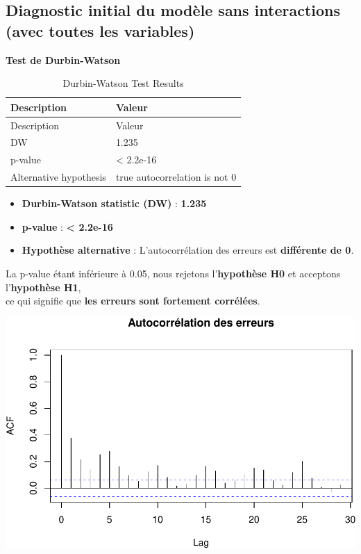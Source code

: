 \documentclass[
  12pt,
]{article}
\providecommand{\tightlist}{%
  \setlength{\itemsep}{0pt}\setlength{\parskip}{0pt}}
\begin{document}
\subsection{Diagnostic initial du modèle sans interactions (avec toutes
les
variables)}\label{diagnostic-initial-du-moduxe8le-sans-interactions-avec-toutes-les-variables}

\textbf{Test de Durbin-Watson}

\begin{longtable}[]{@{}ll@{}}
\caption{Durbin-Watson Test Results}\tabularnewline
\toprule\noalign{}
Description & Valeur \\
\midrule\noalign{}
\endfirsthead
\toprule\noalign{}
Description & Valeur \\
\midrule\noalign{}
\endhead
\bottomrule\noalign{}
\endlastfoot
DW & 1.235 \\
p-value & \textless{} 2.2e-16 \\
Alternative hypothesis & true autocorrelation is not 0 \\
\end{longtable}

\begin{itemize}
\tightlist
\item
  \textbf{Durbin-Watson statistic (DW)} : \textbf{1.235}\\
\item
  \textbf{p-value} : \textbf{\textless{} 2.2e-16}\\
\item
  \textbf{Hypothèse alternative} : L'autocorrélation des erreurs est
  \textbf{différente de 0}.
\end{itemize}

La p-value étant inférieure à 0.05, nous rejetons l'\textbf{hypothèse
H0} et acceptons l'\textbf{hypothèse H1},\\
ce qui signifie que \textbf{les erreurs sont fortement corrélées}.

\includegraphics{rmd_final_files/figure-latex/unnamed-chunk-38-1.pdf}
\end{document}
